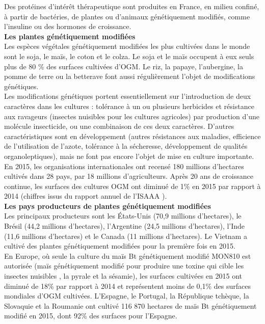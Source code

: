\documentclass[8pt]{article}
\begin{document}
Des protéines d’intérêt thérapeutique sont produites en France, en milieu confiné, à partir de bactéries, de plantes ou d’animaux génétiquement modifiés, comme l’insuline ou des hormones de croissance.\\

\textbf{Les plantes génétiquement modifiées}\\

Les espèces végétales génétiquement modifiées les plus cultivées dans le monde sont le soja, le maïs, le coton et le colza. Le soja et le maïs occupent à eux seuls plus de 80 \% des surfaces cultivées d’OGM. Le riz, la papaye, l’aubergine, la pomme de terre ou la betterave font aussi régulièrement l’objet de modifications génétiques.\\

Les modifications génétiques portent essentiellement sur l’introduction de deux caractères dans les cultures : tolérance à un ou plusieurs herbicides et résistance aux ravageurs (insectes nuisibles pour les cultures agricoles) par production d’une molécule insecticide, ou une combinaison de ces deux caractères. D’autres caractéristiques sont en développement (autres résistances aux maladies, efficience de l’utilisation de l’azote, tolérance à la sécheresse, développement de qualités organoleptiques), mais ne font pas encore l’objet de mise en culture importante.\\

En 2015, les organisations internationales ont recensé 180 millions d’hectares cultivés dans 28 pays, par 18 millions d’agriculteurs. Après 20 ans de croissance continue, les surfaces des cultures OGM ont diminué de 1\% en 2015 par rapport à 2014 (chiffres issus du rapport  annuel de l’ISAAA ).\\

\textbf{Les pays producteurs de plantes génétiquement modifiées}\\

Les principaux producteurs sont les États-Unis (70,9 millions d’hectares), le Brésil (44,2 millions d’hectares), l’Argentine (24,5 millions d’hectares), l’Inde (11,6 millions d’hectares) et le Canada (11 millions d’hectares). Le Vietnam a cultivé des plantes génétiquement modifiées pour la première fois en 2015.\\

En Europe, où seule la culture du maïs Bt génétiquement modifié MON810 est autorisée (maïs génétiquement modifié pour produire une toxine qui cible les insectes nuisibles , la pyrale et la sésamie), les surfaces cultivées en 2015 ont diminué de 18\% par rapport à 2014 et représentent moins de 0,1\% des surfaces mondiales d’OGM cultivées. L’Espagne, le Portugal, la République tchèque, la Slovaquie et la Roumanie ont cultivé 116 870 hectares de maïs Bt génétiquement modifié en 2015, dont 92\% des surfaces pour l’Espagne.\\
\end{document}
